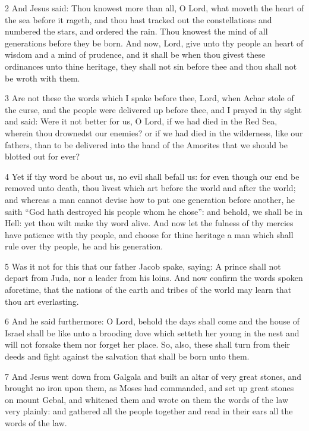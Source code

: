 \par 2 And Jesus said: Thou knowest more than all, O Lord, what moveth the heart of the sea before it rageth, and thou hast tracked out the constellations and numbered the stars, and ordered the rain. Thou knowest the mind of all generations before they be born. And now, Lord, give unto thy people an heart of wisdom and a mind of prudence, and it shall be when thou givest these ordinances unto thine heritage, they shall not sin before thee and thou shall not be wroth with them. 

\par 3 Are not these the words which I spake before thee, Lord, when Achar stole of the curse, and the people were delivered up before thee, and I prayed in thy sight and said: Were it not better for us, O Lord, if we had died in the Red Sea, wherein thou drownedst our enemies? or if we had died in the wilderness, like our fathers, than to be delivered into the hand of the Amorites that we should be blotted out for ever? 

\par 4 Yet if thy word be about us, no evil shall befall us: for even though our end be removed unto death, thou livest which art before the world and after the world; and whereas a man cannot devise how to put one generation before another, he saith “God hath destroyed his people whom he chose”: and behold, we shall be in Hell: yet thou wilt make thy word alive. And now let the fulness of thy mercies have patience with thy people, and choose for thine heritage a man which shall rule over thy people, he and his generation. 

\par 5 Was it not for this that our father Jacob spake, saying: A prince shall not depart from Juda, nor a leader from his loins. And now confirm the words spoken aforetime, that the nations of the earth and tribes of the world may learn that thou art everlasting. 

\par 6 And he said furthermore: O Lord, behold the days shall come and the house of Israel shall be like unto a brooding dove which setteth her young in the nest and will not forsake them nor forget her place. So, also, these shall turn from their deeds and fight against the salvation that shall be born unto them.

\par 7 And Jesus went down from Galgala and built an altar of very great stones, and brought no iron upon them, as Moses had commanded, and set up great stones on mount Gebal, and whitened them and wrote on them the words of the law very plainly: and gathered all the people together and read in their ears all the words of the law. 

